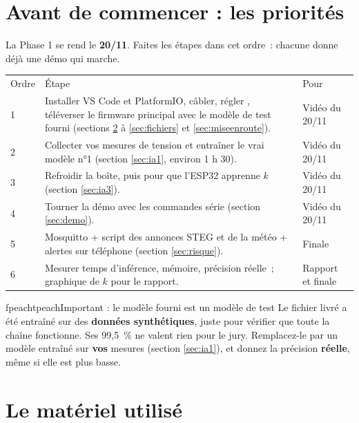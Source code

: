 \section{Avant de commencer : les priorités}\label{sec:prio}

La Phase 1 se rend le \textbf{20/11}. Faites les étapes dans cet ordre~: chacune donne déjà une démo qui marche.

\begin{tabularx}{\linewidth}{P{1.2cm}LP{3.2cm}}
 Ordre & \mdseries Étape & \mdseries Pour \\
1 & Installer VS Code et PlatformIO, câbler, régler , téléverser le firmware principal avec le modèle de test fourni (sections \ref{sec:avoir} à \ref{sec:fichiers} et \ref{sec:miseenroute}). & Vidéo du 20/11 \\
2 & Collecter vos mesures de tension et entraîner le vrai modèle n°1 (section \ref{sec:ia1}, environ 1 h 30). & Vidéo du 20/11 \\
3 & Refroidir la boîte, puis  pour que l'ESP32 apprenne $k$ (section \ref{sec:ia3}). & Vidéo du 20/11 \\
4 & Tourner la démo avec les commandes série (section \ref{sec:demo}). & Vidéo du 20/11 \\
5 & Mosquitto + script des annonces STEG et de la météo + alertes sur téléphone (section \ref{sec:risque}). & Finale \\
6 & Mesurer temps d'inférence, mémoire, précision réelle~; graphique de $k$ pour le rapport. & Rapport et finale \\
\end{tabularx}

\begin{tbox}{fpeach}{tpeach}{Important : le modèle fourni est un modèle de test}
Le fichier  livré a été entraîné sur des \textbf{données synthétiques}, juste pour vérifier que toute la chaîne fonctionne. Ses 99,5~\% ne valent rien pour le jury. Remplacez-le par un modèle entraîné sur \textbf{vos} mesures (section \ref{sec:ia1}), et donnez la précision \textbf{réelle}, même si elle est plus basse.
\end{tbox}

\section{Le matériel utilisé}\label{sec:avoir}

